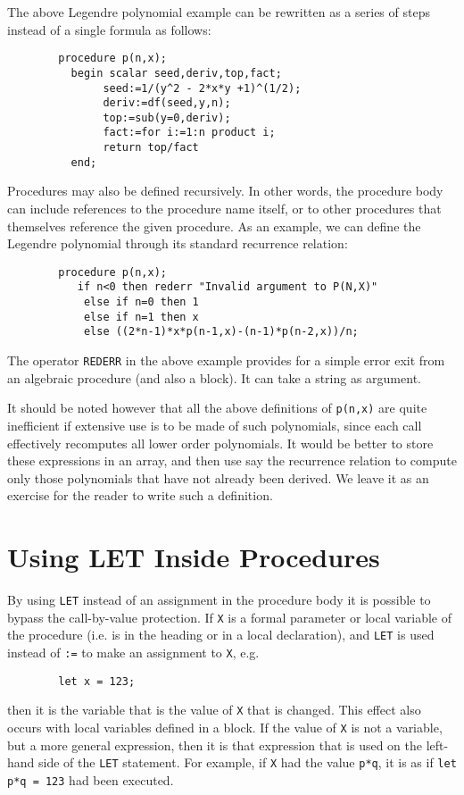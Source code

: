 The above Legendre polynomial example can be rewritten as a series of steps
instead of a single formula as follows:
\begin{verbatim}
        procedure p(n,x);
          begin scalar seed,deriv,top,fact;
               seed:=1/(y^2 - 2*x*y +1)^(1/2);
               deriv:=df(seed,y,n);
               top:=sub(y=0,deriv);
               fact:=for i:=1:n product i;
               return top/fact
          end;
\end{verbatim}
Procedures may also be defined recursively.  In other words, the procedure
body can include references to the procedure name
itself, or to other procedures that themselves reference the given
procedure.  As an example, we can define the Legendre polynomial through
its standard recurrence relation:
\begin{verbatim}
        procedure p(n,x);
           if n<0 then rederr "Invalid argument to P(N,X)"
            else if n=0 then 1
            else if n=1 then x
            else ((2*n-1)*x*p(n-1,x)-(n-1)*p(n-2,x))/n;
\end{verbatim}

The operator {\tt REDERR} in the above example provides
for a simple error exit from an algebraic procedure (and also a block).
It can take a string as argument.

It should be noted however that all the above definitions of {\tt p(n,x)} are
quite inefficient if extensive use is to be made of such polynomials, since
each call effectively recomputes all lower order polynomials. It would be
better to store these expressions in an array, and then use say the
recurrence relation to compute only those polynomials that have not already
been derived. We leave it as an exercise for the reader to write such a
definition.


\section{Using LET Inside Procedures}

By using {\tt LET} instead of an assignment in the procedure
body it is possible to bypass the call-by-value
 protection.  If {\tt X} is a formal parameter or local
variable of the procedure (i.e. is in the heading or in a local
declaration), and {\tt LET} is used instead of {\tt :=} to make an
assignment to {\tt X}, e.g.

\begin{verbatim}
        let x = 123;
\end{verbatim}
then it is the variable that is the value of {\tt X} that is changed.
This effect also occurs with local variables defined in a block.  If the
value of {\tt X} is not a variable, but a more general expression, then it
is that expression that is used on the left-hand side of the {\tt LET}
statement.  For example, if {\tt X} had the value {\tt p*q}, it is as if
{\tt let p*q = 123} had been executed.

